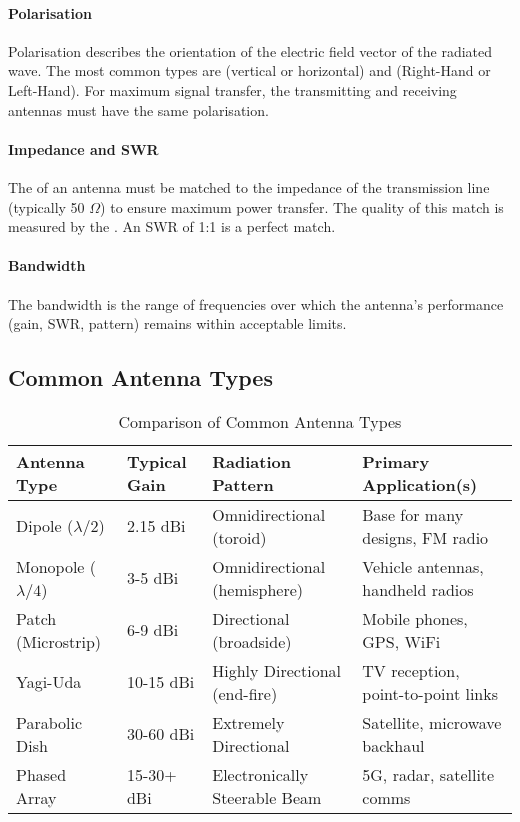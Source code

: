 \paragraph{Polarisation}
Polarisation describes the orientation of the electric field vector of the radiated wave. The most common types are  (vertical or horizontal) and  (Right-Hand or Left-Hand). For maximum signal transfer, the transmitting and receiving antennas must have the same polarisation.

\paragraph{Impedance and SWR}
The  of an antenna must be matched to the impedance of the transmission line (typically 50 $\Omega$) to ensure maximum power transfer. The quality of this match is measured by the . An SWR of 1:1 is a perfect match.

\paragraph{Bandwidth}
The bandwidth is the range of frequencies over which the antenna's performance (gain, SWR, pattern) remains within acceptable limits.


\subsection{Common Antenna Types}

\begin{table}[H]
    \centering
    \caption{Comparison of Common Antenna Types}
    \label{tab:antenna-types}
    \begin{tabularx}{\textwidth}{@{}lXXX@{}}
        \toprule
        \tableheaderfont Antenna Type & \tableheaderfont Typical Gain & \tableheaderfont Radiation Pattern & \tableheaderfont Primary Application(s) \\
        \midrule
        Dipole ($\lambda/2$) & 2.15 dBi & Omnidirectional (toroid) & Base for many designs, FM radio \\
        Monopole ($\lambda/4$) & 3-5 dBi & Omnidirectional (hemisphere) & Vehicle antennas, handheld radios \\
        Patch (Microstrip) & 6-9 dBi & Directional (broadside) & Mobile phones, GPS, WiFi \\
        Yagi-Uda & 10-15 dBi & Highly Directional (end-fire) & TV reception, point-to-point links \\
        Parabolic Dish & 30-60 dBi & Extremely Directional & Satellite, microwave backhaul \\
        Phased Array & 15-30+ dBi & Electronically Steerable Beam & 5G, radar, satellite comms \\
        \bottomrule
    \end{tabularx}
\end{table}


